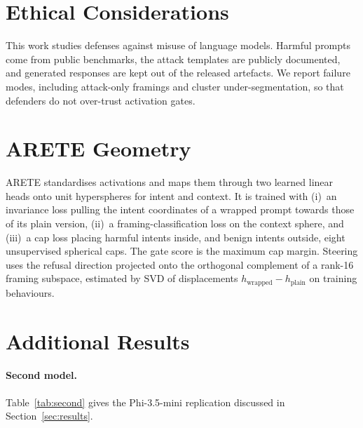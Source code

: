 \documentclass[11pt]{article}
\begin{document}
\section*{Ethical Considerations}
This work studies defenses against misuse of language models. Harmful prompts come from public benchmarks, the attack templates are publicly documented, and generated responses are kept out of the released artefacts. We report failure modes, including attack-only framings and cluster under-segmentation, so that defenders do not over-trust activation gates.



\appendix

\section{ARETE Geometry}
\label{app:arete}
ARETE standardises activations and maps them through two learned linear heads onto unit hyperspheres for intent and context. It is trained with (i)~an invariance loss pulling the intent coordinates of a wrapped prompt towards those of its plain version, (ii)~a framing-classification loss on the context sphere, and (iii)~a cap loss placing harmful intents inside, and benign intents outside, eight unsupervised spherical caps. The gate score is the maximum cap margin. Steering uses the refusal direction projected onto the orthogonal complement of a rank-16 framing subspace, estimated by SVD of displacements $h_{\text{wrapped}}-h_{\text{plain}}$ on training behaviours.

\section{Additional Results}
\label{app:extra}

\paragraph{Second model.}
Table~\ref{tab:second} gives the Phi-3.5-mini replication discussed in Section~\ref{sec:results}.

\begin{table}[t]
\centering
\resizebox{0.8\textwidth}{!}{}
\caption{Replication on Phi-3.5-mini-instruct with the configuration frozen from Qwen2.5-1.5B (user-mean probe, 1\% budget, no tuning), benign-rich traffic, 10 windows. AUROC and \emph{Oracle} recall are for the user-mean probe on the full test split; \emph{Shared}, \emph{Hyb.\,12} and \emph{Hyb.\,30} are recall of the shared threshold and of the hybrid rule with $k_{\max}{=}12$ and $30$. Judged ASR is composed as in Section~\ref{sec:results}.}
\label{tab:second}
\end{table}
\end{document}
